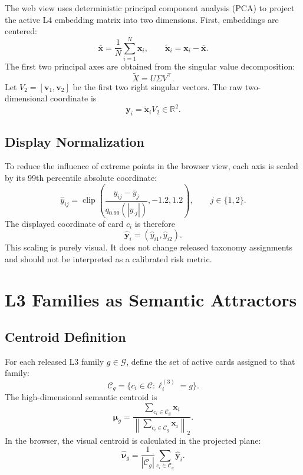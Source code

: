 \documentclass[11pt,a4paper]{article}
\begin{document}
The web view uses deterministic principal component analysis (PCA) to project the active L4 embedding matrix into two dimensions. First, embeddings are centered:
\begin{equation}
\bar{\mathbf{x}} = \frac{1}{N}\sum_{i=1}^{N}\mathbf{x}_i, \qquad
\tilde{\mathbf{x}}_i=\mathbf{x}_i-\bar{\mathbf{x}}.
\end{equation}
The first two principal axes are obtained from the singular value decomposition:
\begin{equation}
\tilde{X}=U\Sigma V^\top.
\end{equation}
Let $V_2=[\mathbf{v}_1,\mathbf{v}_2]$ be the first two right singular vectors. The raw two-dimensional coordinate is
\begin{equation}
\mathbf{y}_i = \tilde{\mathbf{x}}_i V_2 \in \mathbb{R}^{2}.
\end{equation}

\subsection{Display Normalization}

To reduce the influence of extreme points in the browser view, each axis is scaled by its 99th percentile absolute coordinate:
\begin{equation}
\hat{y}_{ij} =
\operatorname{clip}\left(
\frac{y_{ij} - \bar{y}_{j}}{q_{0.99}(|y_{\cdot j}|)},
-1.2,
1.2
\right),
\qquad j \in \{1,2\}.
\end{equation}
The displayed coordinate of card $c_i$ is therefore
\begin{equation}
\hat{\mathbf{y}}_i=(\hat{y}_{i1},\hat{y}_{i2}).
\end{equation}
This scaling is purely visual. It does not change released taxonomy assignments and should not be interpreted as a calibrated risk metric.

\section{L3 Families as Semantic Attractors}

\subsection{Centroid Definition}

For each released L3 family $g \in \mathcal{G}$, define the set of active cards assigned to that family:
\begin{equation}
\mathcal{C}_g=\{c_i \in \mathcal{C}:\ell^{(3)}_i=g\}.
\end{equation}
The high-dimensional semantic centroid is
\begin{equation}
\boldsymbol{\mu}_g =
\frac{\sum_{c_i \in \mathcal{C}_g}\mathbf{x}_i}
{\left\|\sum_{c_i \in \mathcal{C}_g}\mathbf{x}_i\right\|_2}.
\end{equation}
In the browser, the visual centroid is calculated in the projected plane:
\begin{equation}
\hat{\boldsymbol{\nu}}_g =
\frac{1}{|\mathcal{C}_g|}
\sum_{c_i \in \mathcal{C}_g}\hat{\mathbf{y}}_i.
\end{equation}
\end{document}
